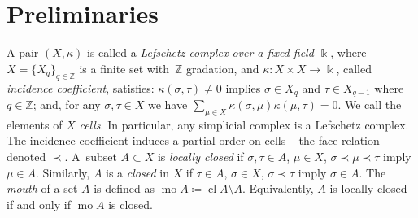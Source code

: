 \documentclass[letterpaper,11pt]{article}
\theoremstyle{plain}
\theoremstyle{definition}
\def\cV{\text{$\mathcal V$}}
\newcommand{\cl}{\operatorname{cl}}
\def\mathobj#1{\mbox{$#1$}}
\def\ZZ{\mathobj{\mathbb{Z}}}
\newcounter{li}
\DeclareMathOperator{\mo}{mo}
\newcommand{\inc}{\kappa}
\newcommand{\facerel}{\prec}
\begin{document}

\section{Preliminaries}
A pair $(X, \kappa)$ is called a \emph{Lefschetz complex over a fixed field $\Bbbk$}, 
    where $X=\{X_q\}_{q\in{\mathbb{Z}}}$ is a finite set with~$\ZZ$ gradation, 
    and $\kappa:X\times X\rightarrow\Bbbk$, called \emph{incidence coefficient}, satisfies:
    $\inc(\sigma, \tau) \neq 0$ implies $\sigma\in X_q$ and $\tau\in X_{q-1}$ where $q\in\ZZ$; 
    and, for any $\sigma,\tau\in X$ we have 
    $\sum_{\mu\in X} \kappa(\sigma,\mu)\kappa(\mu,\tau) = 0$.
We call the elements of $X$ \emph{cells}.
In particular, any simplicial complex is a Lefschetz complex.
The incidence coefficient induces a partial order on cells -- the face relation -- denoted $\facerel$. 
A~subset $A\subset X$ is \emph{locally closed} if $\sigma,\tau\in A$, $\mu\in X$, $\sigma\facerel \mu\facerel \tau$ imply $\mu\in A$. 
Similarly, $A$ is a \emph{closed} in $X$ if $\tau\in A$, $\sigma\in X$, $\sigma\facerel \tau$ imply $\sigma\in A$.
The \emph{mouth} of a set $A$ is defined as $\mo A\coloneqq\cl A\setminus A$.
Equivalently, $A$ is locally closed if and only if $\mo A$ is closed.
\end{document}
